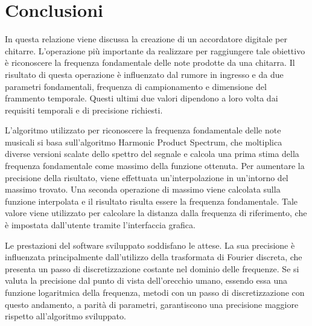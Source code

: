 \chapter{Conclusioni}\label{cap:conclusioni}

In questa relazione viene discussa la creazione di un accordatore digitale per chitarre.
L'operazione più importante da realizzare per raggiungere tale obiettivo è riconoscere la frequenza fondamentale delle note prodotte da una chitarra.
Il risultato di questa operazione è influenzato dal rumore in ingresso e da due parametri fondamentali, frequenza di campionamento e dimensione del frammento temporale.
Questi ultimi due valori dipendono a loro volta dai requisiti temporali e di precisione richiesti.

L'algoritmo utilizzato per riconoscere la frequenza fondamentale delle note musicali si basa sull'algoritmo Harmonic Product Spectrum, che moltiplica diverse versioni scalate dello spettro del segnale e calcola una prima stima della frequenza fondamentale come massimo della funzione ottenuta.
Per aumentare la precisione della risultato, viene effettuata un'interpolazione in un'intorno del massimo trovato.
Una seconda operazione di massimo viene calcolata sulla funzione interpolata e il risultato risulta essere la frequenza fondamentale.
Tale valore viene utilizzato per calcolare la distanza dalla frequenza di riferimento, che è impostata dall'utente tramite l'interfaccia grafica. 

Le prestazioni del software sviluppato soddisfano le attese.
La sua precisione è influenzata principalmente dall'utilizzo della trasformata di Fourier discreta, che presenta un passo di discretizzazione costante nel dominio delle frequenze.
Se si valuta la precisione dal punto di vista dell'orecchio umano, essendo essa una funzione logaritmica della frequenza, metodi con un passo di discretizzazione con questo andamento, a parità di parametri, garantiscono una precisione maggiore rispetto all'algoritmo sviluppato.



